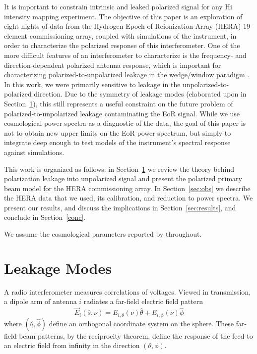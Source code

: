 \documentclass[twocolumn, trackchanges]{aastex61}
\begin{document}
It is important to constrain intrinsic and leaked polarized signal for any {\sc
  Hi} intensity mapping experiment. The objective of this paper is an
exploration of eight nights of data from the Hydrogen Epoch of Reionization
Array (HERA) 19-element commissioning array, coupled with simulations of the
instrument, in order to characterize the polarized response of this
interferometer.  One of the more difficult features of an interferometer to
characterize is the frequency- and direction-dependent polarized antenna
response, which is important for characterizing polarized-to-unpolarized leakage
in the wedge/window paradigm \citep{Moore17,Nunhokee.17,Martinot18}.  In this
work, we were primarily sensitive to leakage in the unpolarized-to-polarized
direction. Due to the symmetry of leakage modes (elaborated upon in
Section~\ref{sec:leak}), this still represents a useful constraint on the future
problem of polarized-to-unpolarized leakage contaminating the EoR signal.  While
we use cosmological power spectra as a diagnostic of the data, the goal of this
paper is not to obtain new upper limits on the EoR power spectrum, but simply to
integrate deep enough to test models of the instrument's spectral response
against simulations.

This work is organized as follows: in Section~\ref{sec:leak} we review the
theory behind polarization leakage into unpolarized signal and present the
polarized primary beam model for the HERA commissioning array. In
Section~\ref{sec:obs} we describe the HERA data that we used, its calibration,
and reduction to power spectra. We present our results, and discuss the
implications in Section~\ref{sec:results}, and conclude in Section~\ref{conc}.

We assume the cosmological parameters reported by \cite{Planck.16} throughout.

\section{Leakage Modes}
\label{sec:leak}

A radio interferometer measures correlations of voltages. Viewed in
transmission, a dipole arm of antenna $i$ radiates a far-field electric field
pattern
\begin{equation}
\vec{E}_{i}(\hat{s}, \nu) = E_{i,\theta}(\nu)\hat{\theta} + E_{i,\phi}(\nu)\hat{\phi}
\end{equation}
where $(\hat{\theta},\hat{\phi})$ define an orthogonal coordinate system on the
sphere. These far-field beam patterns, by the reciprocity theorem, define the
response of the feed to an electric field from infinity in the direction
$(\theta,\phi)$.
\end{document}
